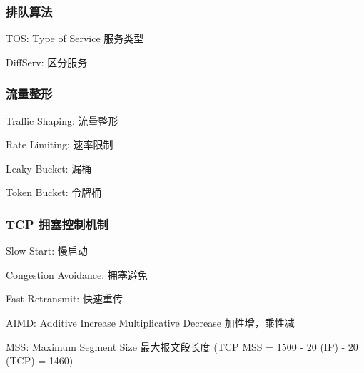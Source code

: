 \documentclass[UTF8,cs4size]{ctexart}
\begin{document}
\subsubsection{排队算法}
\begin{compactitem}
  \item TOS: Type of Service 服务类型
  \item DiffServ: 区分服务
\end{compactitem}
\subsubsection{流量整形}
\begin{compactitem}
  \item Traffic Shaping: 流量整形
  \item Rate Limiting: 速率限制
  \item Leaky Bucket: 漏桶
  \item Token Bucket: 令牌桶
\end{compactitem}
\subsubsection{TCP 拥塞控制机制}
\begin{compactitem}
  \item Slow Start: 慢启动
  \item Congestion Avoidance: 拥塞避免
  \item Fast Retransmit: 快速重传
  \item AIMD: Additive Increase Multiplicative Decrease 加性增，乘性减
  \item MSS: Maximum Segment Size 最大报文段长度 (TCP MSS = 1500 - 20 (IP) - 20 (TCP) = 1460)
\end{compactitem}
\end{document}
